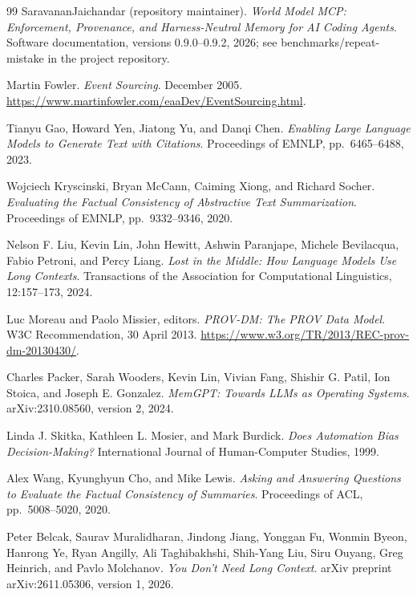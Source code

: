 \documentclass[11pt]{article}
\begin{document}
\begin{thebibliography}{99}
SaravananJaichandar (repository maintainer).
\newblock \emph{World Model MCP: Enforcement, Provenance, and Harness-Neutral Memory for AI Coding Agents}.
\newblock Software documentation, versions 0.9.0--0.9.2, 2026; see benchmarks/repeat-mistake in the project repository.

Martin Fowler.
\newblock \emph{Event Sourcing}.
 December 2005. \url{https://www.martinfowler.com/eaaDev/EventSourcing.html}.

Tianyu Gao, Howard Yen, Jiatong Yu, and Danqi Chen.
\newblock \emph{Enabling Large Language Models to Generate Text with Citations}.
\newblock Proceedings of EMNLP, pp.~6465--6488, 2023.

Wojciech Kryscinski, Bryan McCann, Caiming Xiong, and Richard Socher.
\newblock \emph{Evaluating the Factual Consistency of Abstractive Text Summarization}.
\newblock Proceedings of EMNLP, pp.~9332--9346, 2020.

Nelson F. Liu, Kevin Lin, John Hewitt, Ashwin Paranjape, Michele Bevilacqua, Fabio Petroni, and Percy Liang.
\newblock \emph{Lost in the Middle: How Language Models Use Long Contexts}.
\newblock Transactions of the Association for Computational Linguistics, 12:157--173, 2024.

Luc Moreau and Paolo Missier, editors.
\newblock \emph{PROV-DM: The PROV Data Model}.
\newblock W3C Recommendation, 30 April 2013. \url{https://www.w3.org/TR/2013/REC-prov-dm-20130430/}.

Charles Packer, Sarah Wooders, Kevin Lin, Vivian Fang, Shishir G. Patil, Ion Stoica, and Joseph E. Gonzalez.
\newblock \emph{MemGPT: Towards LLMs as Operating Systems}.
\newblock arXiv:2310.08560, version 2, 2024.

Linda J. Skitka, Kathleen L. Mosier, and Mark Burdick.
\newblock \emph{Does Automation Bias Decision-Making?}
\newblock International Journal of Human-Computer Studies, 1999.

Alex Wang, Kyunghyun Cho, and Mike Lewis.
\newblock \emph{Asking and Answering Questions to Evaluate the Factual Consistency of Summaries}.
\newblock Proceedings of ACL, pp.~5008--5020, 2020.

Peter Belcak, Saurav Muralidharan, Jindong Jiang, Yonggan Fu, Wonmin Byeon, Hanrong Ye, Ryan Angilly, Ali Taghibakhshi, Shih-Yang Liu, Siru Ouyang, Greg Heinrich, and Pavlo Molchanov.
\newblock \emph{You Don't Need Long Context}.
\newblock arXiv preprint arXiv:2611.05306, version 1, 2026.

\end{thebibliography}
\end{document}

